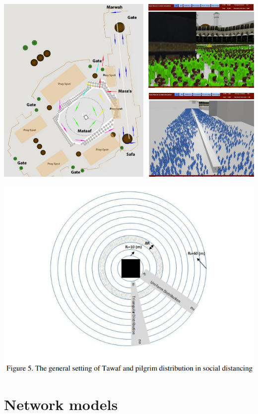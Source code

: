\documentclass[aspectratio=43]{beamer}
\begin{document}
\begin{frame}
\begin{center}
\includegraphics[width=\textwidth]{FIGS/ABM_Hajj_setup.png}
\end{center}
\end{frame}


\begin{frame}
\begin{center}
\includegraphics[width=\textwidth]{FIGS/ABM_Hajj_config_tawaf.png}
\end{center}
\end{frame}


\section{Network models}
\end{document}
